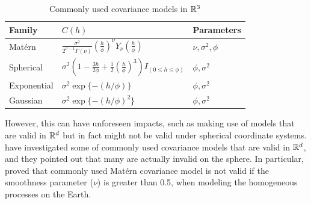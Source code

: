 \begin{table}[H]
\centering
\caption[Commonly used Covariance Models in $\R^3$]{Commonly used covariance models in $\R^3$}
\label{common_cov}
\vskip 16pt
\begin{tabular}{|l|l|l|}
\hline
Family & $C(h)$  & Parameters \\ \hline \hline
Mat\'{e}rn &  $\frac{\sigma^2}{2^{\nu-1}\Gamma(\nu)} (\frac{h}{\phi})^{\nu} Y_{\nu}(\frac{h}{\phi})$  & $\nu, \sigma^2, \phi$  \\

Spherical & $\sigma^2(1-\frac{3h}{2\phi}+\frac{1}{2}(\frac{h}{\phi})^3)I_{(0\le h\le \phi)}$ & $\phi, \sigma^2$ \\

Exponential & $\sigma^2\exp\{-(h/\phi)\}$ & $\phi, \sigma^2$  \\

Gaussian & $\sigma^2\exp \{-(h/\phi)^2\}$ & $\phi, \sigma^2$  \\ \hline
\end{tabular}
\end{table}
However, this can have unforeseen impacts, such as making use of models that are valid in $\mathbb{R}^d$ but in fact might not be valid under spherical coordinate systems. \cite{HuangZhangRobeson2011} have investigated some of commonly used covariance models that are valid in $\mathbb{R}^d$, and they pointed out that many are actually invalid on the sphere. In particular, \cite{Gneiting2013} proved that commonly used Mat\'{e}rn covariance model is not valid if the smoothness parameter ($\nu$) is greater than 0.5, when modeling the homogeneous processes on the Earth.\\

